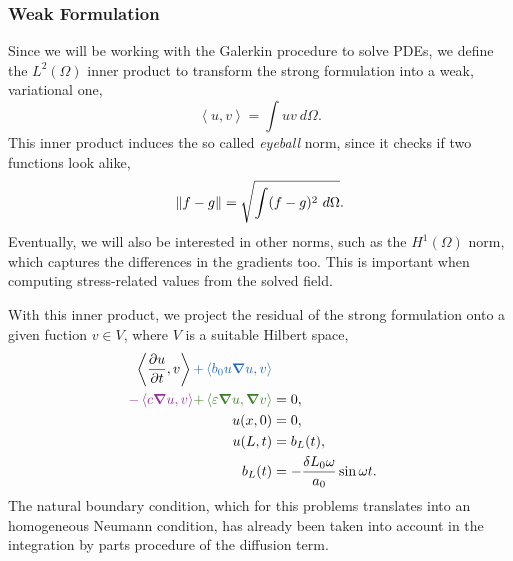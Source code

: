 \documentclass[../../thesis.tex]{subfiles}
\newcommand{\inner}[2]{\left<#1, #2\right>}
\begin{document}
\subsubsection{Weak Formulation}
Since we will be working with the Galerkin procedure to solve PDEs, 
we define the $L^2(\Omega)$ inner product to transform the strong formulation into a weak, variational one,
\begin{equation}
    \inner{u}{v} = \int uv\ d\Omega.
\end{equation}
This inner product induces the so called \emph{eyeball} norm, since it checks if two functions look alike,
\begin{equation}
    \norm{f-g}  = \sqrt{\int (f - g)^2\ d\Omega}.
\end{equation}
Eventually, we will also be interested in other norms, such as the $H^1(\Omega)$ norm, which captures the differences in the gradients too.
This is important when computing stress-related values from the solved field.

With this inner product, we project the residual of the strong formulation onto a given fuction $v \in V$,
where $V$ is a suitable Hilbert space,
\begin{subequations}
    \begin{align}
        \label{eq:1d_fom_weak_formulation}
        \inner{\frac{\partial u}{\partial t}}{v} 
        \textcolor{NavyBlue}{+ \inner{b_0 u \grad u}{v}}
        \nonumber \\ 
        \textcolor{Purple}{- \inner{c \grad u}{v}} 
        \textcolor{OliveGreen}{+ \inner{\varepsilon \grad u}{\grad v}} 
        &= 0,  
        \\
        u(x, 0) &= 0, 
        \\
        u(L, t) &= b_L(t), 
        \\
        b_L(t) &= - \frac{\delta L_0 \omega}{a_0} \sin \omega t.
    \end{align}
\end{subequations}
The natural boundary condition, which for this problems translates into an homogeneous Neumann condition,
has already been taken into account in the integration by parts procedure of the diffusion term. 
\end{document}
